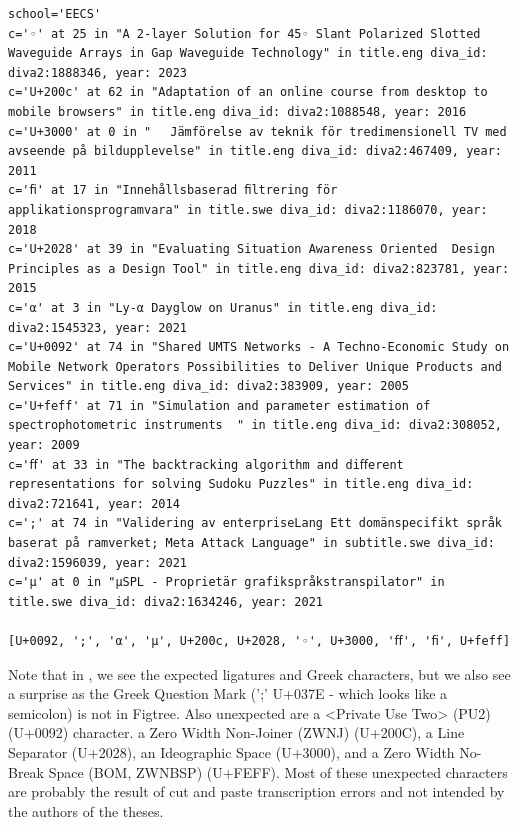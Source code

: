 \documentclass[12pt, twoside]{article}
\begin{document}
\begin{lstlisting}[style=latexExampleForAuthors,  escapechar=|, 
caption={Part of the output about characters missing from Figtree that are actually used in DiVA in English and Swedish titles and subtitles - for the EECS school.},
label=lst:missingFigtreeEECS]
\end{lstlisting}
\begin{Verbatim}[breaklines=true, commandchars=\\\{\}]
school='EECS'
c='◦' at 25 in "A 2-layer Solution for 45◦ Slant Polarized Slotted Waveguide Arrays in Gap Waveguide Technology" in title.eng diva_id: diva2:1888346, year: 2023
c='U+200c' at 62 in "Adaptation of an online course from desktop to mobile browsers‌‌" in title.eng diva_id: diva2:1088548, year: 2016
c='U+3000' at 0 in "　 Jämförelse av teknik för tredimensionell TV med avseende på bildupplevelse" in title.eng diva_id: diva2:467409, year: 2011
c='ﬁ' at 17 in "Innehållsbaserad ﬁltrering för applikationsprogramvara" in title.swe diva_id: diva2:1186070, year: 2018
c='U+2028' at 39 in "Evaluating Situation Awareness Oriented  Design Principles as a Design Tool" in title.eng diva_id: diva2:823781, year: 2015
c='α' at 3 in "Ly-α Dayglow on Uranus" in title.eng diva_id: diva2:1545323, year: 2021
c='U+0092' at 74 in "Shared UMTS Networks - A Techno-Economic Study on Mobile Network Operators Possibilities to Deliver Unique Products and Services" in title.eng diva_id: diva2:383909, year: 2005
c='U+feff' at 71 in "Simulation and parameter estimation of spectrophotometric instruments  ﻿" in title.eng diva_id: diva2:308052, year: 2009
c='ﬀ' at 33 in "The backtracking algorithm and diﬀerent representations for solving Sudoku Puzzles" in title.eng diva_id: diva2:721641, year: 2014
c=';' at 74 in "Validering av enterpriseLang Ett domänspecifikt språk baserat på ramverket; Meta Attack Language" in subtitle.swe diva_id: diva2:1596039, year: 2021
c='μ' at 0 in "μSPL - Proprietär grafikspråkstranspilator" in title.swe diva_id: diva2:1634246, year: 2021

[U+0092, ';', 'α', 'μ', U+200c, U+2028, '◦', U+3000, 'ﬀ', 'ﬁ', U+feff]
\end{Verbatim}
\FloatBarrier

Note that in , we see the expected ligatures and Greek characters, but we also see a surprise as the Greek Question Mark (';' U+037E - which looks like a semicolon) is not in Figtree. Also unexpected are a <Private Use Two> (PU2) (U+0092) character. a Zero Width Non-Joiner (ZWNJ) (U+200C), a Line Separator (U+2028), an Ideographic Space (U+3000), and a Zero Width No-Break Space (BOM, ZWNBSP) (U+FEFF). Most of these unexpected characters are probably the result of cut and paste transcription errors and not intended by the authors of the theses.
\end{document}
